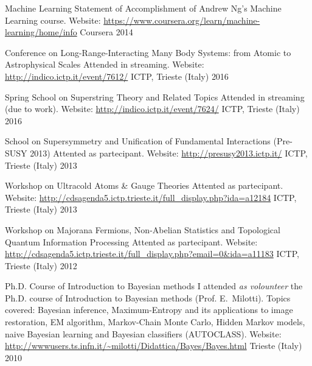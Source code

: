 


\begin{cvhonors}
  \cvhonor
{Machine Learning}
{Statement of Accomplishment of Andrew Ng's Machine Learning course. 
   Website:
   \url{https://www.coursera.org/learn/machine-learning/home/info}}
{Coursera}
{2014}

\end{cvhonors}



\begin{cvhonors}
  \cvhonor
{Conference on Long-Range-Interacting Many Body Systems: from Atomic to
   Astrophysical Scales }
{Attended in streaming.  Website: \url{http://indico.ictp.it/event/7612/}}
{ICTP, Trieste (Italy)}
{2016}

  \cvhonor
{Spring School on Superstring Theory and Related Topics}
{Attended in streaming (due to work).  Website: \url{http://indico.ictp.it/event/7624/}}
{ICTP, Trieste (Italy)}
{2016}


  \cvhonor
{School on Supersymmetry and Unification of Fundamental Interactions (Pre-SUSY 2013)}
{%
   Attented as partecipant. 
   Website: 
   \url{http://presusy2013.ictp.it/}}
{ICTP, Trieste (Italy)}
{2013}

  \cvhonor
{Workshop on Ultracold Atoms \& Gauge Theories}
{%
   Attented as partecipant. 
   Website:
   \url{http://cdsagenda5.ictp.trieste.it/full_display.php?ida=a12184}}
{ICTP, Trieste (Italy)}
{2013}

  \cvhonor
{Workshop on Majorana Fermions, Non-Abelian Statistics and Topological Quantum Information Processing}%
{%
   Attented as partecipant. 
   Website:
   \url{http://cdsagenda5.ictp.trieste.it/full_display.php?email=0&ida=a11183}}
{ICTP, Trieste (Italy)}
{2012}

  \cvhonor
{Ph.D. Course of Introduction to Bayesian methods}
{I attended \emph{as volounteer} the Ph.D. course of Introduction to Bayesian methods (Prof.
   E.~Milotti).
Topics covered: Bayesian inference, Maximum-Entropy and its applications
to image restoration, EM algorithm, Markov-Chain Monte Carlo, Hidden Markov
models, 
naive Bayesian learning and 
Bayesian classifiers (AUTOCLASS). 
Website:
\url{http://wwwusers.ts.infn.it/~milotti/Didattica/Bayes/Bayes.html}
}
{Trieste (Italy)}
{2010}%





 \end{cvhonors}









